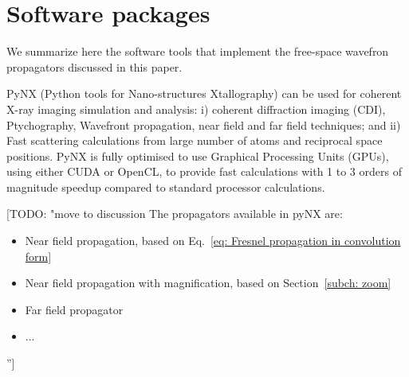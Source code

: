 \documentclass{iucr}              %
\newcommand{\todo}[1]{{\color{red}[TODO: "#1'']}}
\newcommand{\inred}[1]{{\color{red}#1}}
\begin{document}
% 


\section{Software packages}
\label{ch: packages}

We summarize here the software tools that implement the free-space wavefron propagators discussed in this paper. 

PyNX \cite{Favre-Nicolin:hx5119} (Python tools for Nano-structures Xtallography) can be used for coherent X-ray imaging simulation and analysis: i) coherent diffraction imaging (CDI), Ptychography, Wavefront propagation, near field and far field techniques; and ii) Fast scattering calculations from large number of atoms and reciprocal space positions. PyNX is fully optimised to use Graphical Processing Units (GPUs), using either CUDA or OpenCL, to provide fast calculations with 1 to 3 orders of magnitude speedup compared to standard processor calculations. 

\todo{move to discussion 
The propagators available in pyNX are: 
\begin{itemize}
    \item Near field propagation, based on Eq.~\ref{eq: Fresnel propagation in convolution form}
    \item Near field propagation with magnification, based on Section~\ref{subch: zoom}
    \item Far field propagator
    \item \inred{...}
\end{itemize}
}
\end{document}
